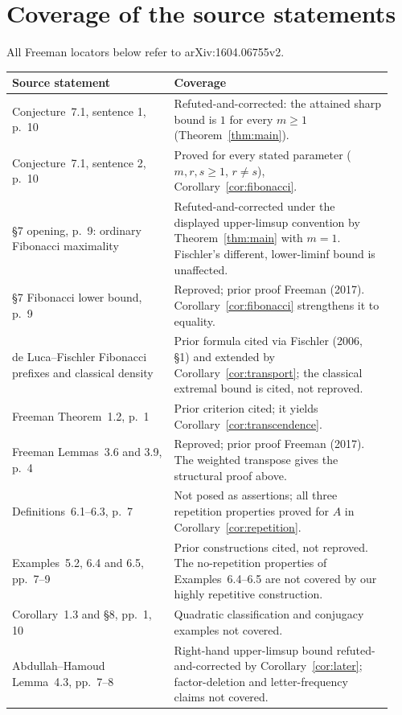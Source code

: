 \documentclass[11pt]{article}
\begin{document}
\section{Coverage of the source statements}
All Freeman locators below refer to arXiv:1604.06755v2.
\begin{center}\small
\begin{tabular}{@{}p{0.40\linewidth}p{0.54\linewidth}@{}}\toprule
Source statement & Coverage \\\midrule
Conjecture~7.1, sentence 1, p.~10 & Refuted-and-corrected:
the attained sharp bound is $1$ for every $m\geq1$
(Theorem~\ref{thm:main}).\\[3pt]
Conjecture~7.1, sentence 2, p.~10 & Proved for every stated parameter
($m,r,s\geq1$, $r\ne s$), Corollary~\ref{cor:fibonacci}.\\[3pt]
\S7 opening, p.~9: ordinary Fibonacci maximality & Refuted-and-corrected
under the displayed upper-limsup convention by Theorem~\ref{thm:main}
with $m=1$. Fischler's different, lower-liminf bound is unaffected.\\[3pt]
\S7 Fibonacci lower bound, p.~9 & Reproved; prior proof Freeman (2017).
Corollary~\ref{cor:fibonacci} strengthens it to equality.\\[3pt]
de Luca--Fischler Fibonacci prefixes and classical density & Prior formula
cited via Fischler (2006, \S1) and extended by Corollary~\ref{cor:transport}; the classical extremal
bound is cited, not reproved.\\[3pt]
Freeman Theorem~1.2, p.~1 & Prior criterion cited; it yields
Corollary~\ref{cor:transcendence}.\\[3pt]
Freeman Lemmas~3.6 and 3.9, p.~4 & Reproved; prior proof Freeman (2017).
The weighted transpose gives the structural proof above.\\[3pt]
Definitions~6.1--6.3, p.~7 & Not posed as assertions; all three repetition
properties proved for $A$ in Corollary~\ref{cor:repetition}.\\[3pt]
Examples~5.2, 6.4 and 6.5, pp.~7--9 & Prior constructions cited, not
reproved. The no-repetition properties of Examples~6.4--6.5 are not covered
by our highly repetitive construction.\\[3pt]
Corollary~1.3 and \S8, pp.~1, 10 & Quadratic classification and conjugacy
examples not covered.\\[3pt]
Abdullah--Hamoud Lemma~4.3, pp.~7--8 & Right-hand upper-limsup bound
refuted-and-corrected by Corollary~\ref{cor:later}; factor-deletion and
letter-frequency claims not covered.\\\bottomrule
\end{tabular}
\end{center}
\end{document}
